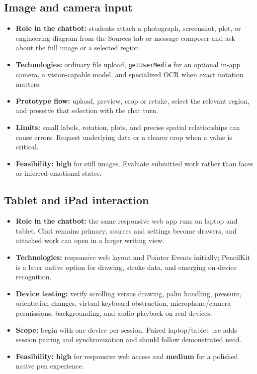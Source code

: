 \documentclass[11pt]{article}
\begin{document}
\subsection{Image and camera input}
\begin{itemize}
\item \textbf{Role in the chatbot:} students attach a photograph, screenshot, plot, or engineering diagram from the Sources tab or message composer and ask about the full image or a selected region.
\item \textbf{Technologies:} ordinary file upload, \texttt{getUserMedia} for an optional in-app camera, a vision-capable model, and specialized OCR when exact notation matters.\cite{media,vision,mathpix}
\item \textbf{Prototype flow:} upload, preview, crop or retake, select the relevant region, and preserve that selection with the chat turn.
\item \textbf{Limits:} small labels, rotation, plots, and precise spatial relationships can cause errors. Request underlying data or a clearer crop when a value is critical.
\item \textbf{Feasibility: high} for still images. Evaluate submitted work rather than faces or inferred emotional states.
\end{itemize}

\subsection{Tablet and iPad interaction}
\begin{itemize}
\item \textbf{Role in the chatbot:} the same responsive web app runs on laptop and tablet. Chat remains primary; sources and settings become drawers, and attached work can open in a larger writing view.
\item \textbf{Technologies:} responsive web layout and Pointer Events initially; PencilKit is a later native option for drawing, stroke data, and emerging on-device recognition.\cite{pointer,pencil}
\item \textbf{Device testing:} verify scrolling versus drawing, palm handling, pressure, orientation changes, virtual-keyboard obstruction, microphone/camera permissions, backgrounding, and audio playback on real devices.
\item \textbf{Scope:} begin with one device per session. Paired laptop/tablet use adds session pairing and synchronization and should follow demonstrated need.
\item \textbf{Feasibility: high} for responsive web access and \textbf{medium} for a polished native pen experience.
\end{itemize}
\end{document}
